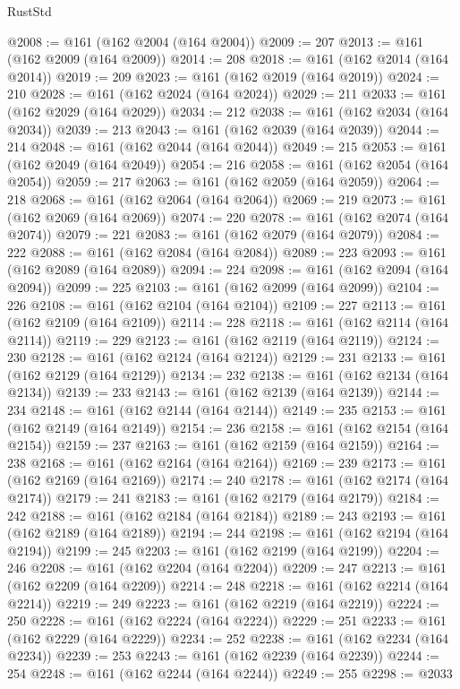 \begin{lexlean}{RustStd}
\begin{coremodule}
@2008 := @161 (@162 @2004 (@164 @2004))
@2009 := 207
@2013 := @161 (@162 @2009 (@164 @2009))
@2014 := 208
@2018 := @161 (@162 @2014 (@164 @2014))
@2019 := 209
@2023 := @161 (@162 @2019 (@164 @2019))
@2024 := 210
@2028 := @161 (@162 @2024 (@164 @2024))
@2029 := 211
@2033 := @161 (@162 @2029 (@164 @2029))
@2034 := 212
@2038 := @161 (@162 @2034 (@164 @2034))
@2039 := 213
@2043 := @161 (@162 @2039 (@164 @2039))
@2044 := 214
@2048 := @161 (@162 @2044 (@164 @2044))
@2049 := 215
@2053 := @161 (@162 @2049 (@164 @2049))
@2054 := 216
@2058 := @161 (@162 @2054 (@164 @2054))
@2059 := 217
@2063 := @161 (@162 @2059 (@164 @2059))
@2064 := 218
@2068 := @161 (@162 @2064 (@164 @2064))
@2069 := 219
@2073 := @161 (@162 @2069 (@164 @2069))
@2074 := 220
@2078 := @161 (@162 @2074 (@164 @2074))
@2079 := 221
@2083 := @161 (@162 @2079 (@164 @2079))
@2084 := 222
@2088 := @161 (@162 @2084 (@164 @2084))
@2089 := 223
@2093 := @161 (@162 @2089 (@164 @2089))
@2094 := 224
@2098 := @161 (@162 @2094 (@164 @2094))
@2099 := 225
@2103 := @161 (@162 @2099 (@164 @2099))
@2104 := 226
@2108 := @161 (@162 @2104 (@164 @2104))
@2109 := 227
@2113 := @161 (@162 @2109 (@164 @2109))
@2114 := 228
@2118 := @161 (@162 @2114 (@164 @2114))
@2119 := 229
@2123 := @161 (@162 @2119 (@164 @2119))
@2124 := 230
@2128 := @161 (@162 @2124 (@164 @2124))
@2129 := 231
@2133 := @161 (@162 @2129 (@164 @2129))
@2134 := 232
@2138 := @161 (@162 @2134 (@164 @2134))
@2139 := 233
@2143 := @161 (@162 @2139 (@164 @2139))
@2144 := 234
@2148 := @161 (@162 @2144 (@164 @2144))
@2149 := 235
@2153 := @161 (@162 @2149 (@164 @2149))
@2154 := 236
@2158 := @161 (@162 @2154 (@164 @2154))
@2159 := 237
@2163 := @161 (@162 @2159 (@164 @2159))
@2164 := 238
@2168 := @161 (@162 @2164 (@164 @2164))
@2169 := 239
@2173 := @161 (@162 @2169 (@164 @2169))
@2174 := 240
@2178 := @161 (@162 @2174 (@164 @2174))
@2179 := 241
@2183 := @161 (@162 @2179 (@164 @2179))
@2184 := 242
@2188 := @161 (@162 @2184 (@164 @2184))
@2189 := 243
@2193 := @161 (@162 @2189 (@164 @2189))
@2194 := 244
@2198 := @161 (@162 @2194 (@164 @2194))
@2199 := 245
@2203 := @161 (@162 @2199 (@164 @2199))
@2204 := 246
@2208 := @161 (@162 @2204 (@164 @2204))
@2209 := 247
@2213 := @161 (@162 @2209 (@164 @2209))
@2214 := 248
@2218 := @161 (@162 @2214 (@164 @2214))
@2219 := 249
@2223 := @161 (@162 @2219 (@164 @2219))
@2224 := 250
@2228 := @161 (@162 @2224 (@164 @2224))
@2229 := 251
@2233 := @161 (@162 @2229 (@164 @2229))
@2234 := 252
@2238 := @161 (@162 @2234 (@164 @2234))
@2239 := 253
@2243 := @161 (@162 @2239 (@164 @2239))
@2244 := 254
@2248 := @161 (@162 @2244 (@164 @2244))
@2249 := 255
@2298 := @2033

\end{coremodule}
\end{lexlean}
